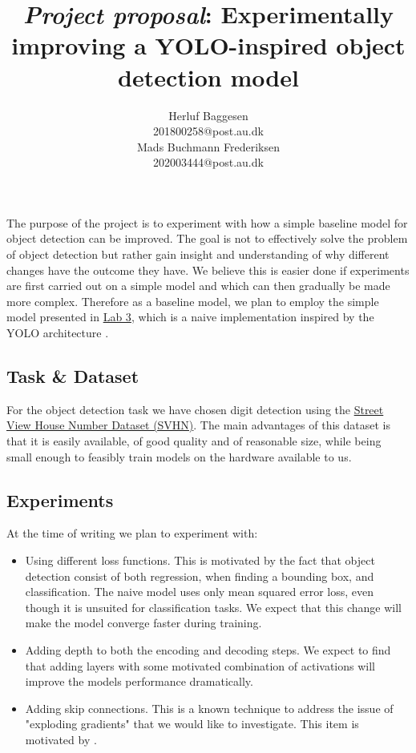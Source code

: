 \documentclass{article}
\title{\emph{Project proposal}: Experimentally improving a YOLO-inspired object detection model}
\author{
	Herluf Baggesen \\
	201800258@post.au.dk \\
	\And
	Mads Buchmann Frederiksen \\
	202003444@post.au.dk\\
}
\date{}
\begin{document}
\maketitle

The purpose of the project is to experiment with how a simple baseline model for object detection can be improved. 
The goal is not to effectively solve the problem of object detection but rather gain insight and understanding of why different changes have the outcome they have. We believe this is easier done if experiments are first carried out on a simple model and which can then gradually be made more complex. 
Therefore as a baseline model, we plan to employ the simple model presented in \href{https://github.com/klaverhenrik/Deep-Learing-for-Visual-Recognition-2022/blob/main/Lab3_FunWithMNIST.ipynb}{Lab 3}, which is a naive implementation inspired by the YOLO architecture \citep{YOLO}.

\subsection{Task \& Dataset}
For the object detection task we have chosen digit detection using the \href{http://ufldl.stanford.edu/housenumbers/}{Street View House Number Dataset (SVHN)}. The main advantages of this dataset is that it is easily available, of good quality and of reasonable size, while being small enough to feasibly train models on the hardware available to us.
\subsection{Experiments}
At the time of writing we plan to experiment with:
\begin{itemize}
\item Using different loss functions. This is motivated by the fact that object detection consist of both regression, when finding a bounding box, and classification. The naive model uses only mean squared error loss, even though it is unsuited for classification tasks. We expect that this change will make the model converge faster during training.
\item Adding depth to both the encoding and decoding steps. We expect to find that adding layers with some motivated combination of activations will improve the models performance dramatically.
\item Adding skip connections. This is a known technique to address the issue of "exploding gradients" that we would like to investigate. This item is motivated by \citep{SGP}.
\end{itemize}
\end{document}
